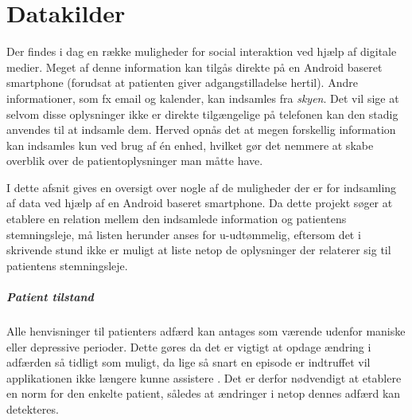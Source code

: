 \chapter{Datakilder}\label{datasamling}
Der findes i dag en række muligheder for social interaktion ved hjælp af digitale medier.
Meget af denne information kan tilgås direkte på en Android baseret smartphone (forudsat at patienten giver adgangstilladelse hertil).
Andre informationer, som fx email og kalender, kan indsamles fra \textit{skyen}.
Det vil sige at selvom disse oplysninger ikke er direkte tilgængelige på telefonen kan den stadig anvendes til at indsamle dem.
Herved opnås det at megen forskellig information kan indsamles kun ved brug af én enhed, hvilket gør det nemmere at skabe overblik over de patientoplysninger man måtte have.

I dette afsnit gives en oversigt over nogle af de muligheder der er for indsamling af data ved hjælp af en Android baseret smartphone.
Da dette projekt søger at etablere en relation mellem den indsamlede information og patientens stemningsleje, må listen herunder anses for u-udtømmelig, eftersom det i skrivende stund ikke er muligt at liste netop de oplysninger der relaterer sig til patientens stemningsleje.

\paragraph{Patient tilstand}
Alle henvisninger til patienters adfærd kan antages som værende udenfor maniske eller depressive perioder.
Dette gøres da det er vigtigt at opdage ændring i adfærden så tidligt som muligt, da lige så snart en episode er indtruffet vil applikationen ikke længere kunne assistere .
Det er derfor nødvendigt at etablere en norm for den enkelte patient, således at ændringer i netop dennes adfærd kan detekteres.








